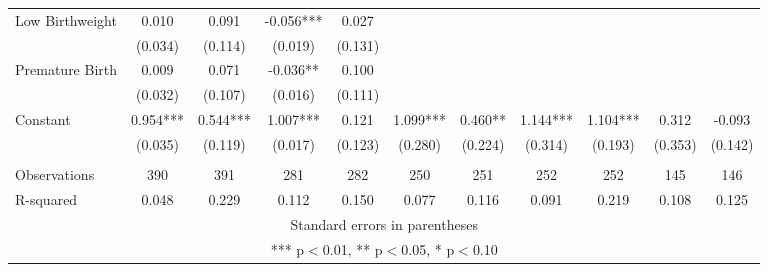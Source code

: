 \begin{tabular}{lcccccccccc}
Low Birthweight & 0.010 & 0.091 & -0.056*** & 0.027 &  &  &  &  &  &  \\
 & (0.034) & (0.114) & (0.019) & (0.131) &  &  &  &  &  &  \\
Premature Birth & 0.009 & 0.071 & -0.036** & 0.100 &  &  &  &  &  &  \\
 & (0.032) & (0.107) & (0.016) & (0.111) &  &  &  &  &  &  \\
Constant & 0.954*** & 0.544*** & 1.007*** & 0.121 & 1.099*** & 0.460** & 1.144*** & 1.104*** & 0.312 & -0.093 \\
 & (0.035) & (0.119) & (0.017) & (0.123) & (0.280) & (0.224) & (0.314) & (0.193) & (0.353) & (0.142) \\
 &  &  &  &  &  &  &  &  &  &  \\
Observations & 390 & 391 & 281 & 282 & 250 & 251 & 252 & 252 & 145 & 146 \\
 R-squared & 0.048 & 0.229 & 0.112 & 0.150 & 0.077 & 0.116 & 0.091 & 0.219 & 0.108 & 0.125 \\ \hline
\multicolumn{11}{c}{ Standard errors in parentheses} \\
\multicolumn{11}{c}{ *** p$<$0.01, ** p$<$0.05, * p$<$0.10} \\
\end{tabular}
